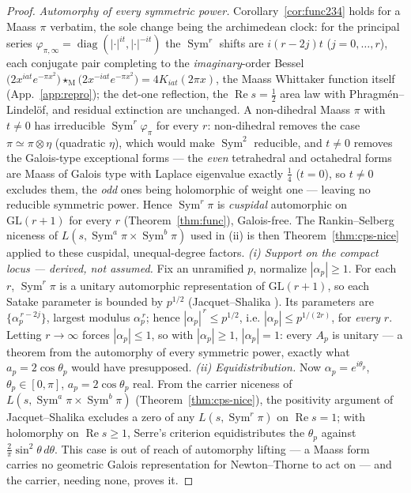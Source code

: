 \documentclass[11pt]{article}
\theoremstyle{definition}
\renewcommand{\Re}{\operatorname{Re}}
\newcommand{\Sym}{\operatorname{Sym}}
\begin{document}
\begin{proof}
\emph{Automorphy of every symmetric power.} Corollary~\ref{cor:func234} holds for a Maass $\pi$ verbatim, the
sole change being the archimedean clock: for the principal series
$\varphi_{\pi,\infty}=\operatorname{diag}(|\cdot|^{it},|\cdot|^{-it})$ the $\Sym^r$ shifts are $i(r-2j)t$
($j=0,\dots,r$), each conjugate pair completing to the \emph{imaginary}-order Bessel
$\big(2x^{iat}e^{-\pi x^2}\big)\star_{\mathrm M}\big(2x^{-iat}e^{-\pi x^2}\big)=4K_{iat}(2\pi x)$, the Maass
Whittaker function itself (App.~\ref{app:repro}); the det-one reflection, the $\Re s=\tfrac12$ area law with
Phragm\'en--Lindel\"of, and residual extinction are unchanged. A non-dihedral Maass $\pi$ with $t\neq0$ has
irreducible $\Sym^r\varphi_\pi$ for every $r$: non-dihedral removes the case $\pi\simeq\pi\otimes\eta$ (quadratic
$\eta$), which would make $\Sym^2$ reducible, and $t\neq0$ removes the Galois-type exceptional forms --- the
\emph{even} tetrahedral and octahedral forms are Maass of Galois type with Laplace eigenvalue exactly $\tfrac14$
($t=0$), so $t\neq0$ excludes them, the \emph{odd} ones being holomorphic of weight one --- leaving no reducible
symmetric power. Hence $\Sym^r\pi$ is \emph{cuspidal} automorphic on $\mathrm{GL}(r+1)$ for
every $r$ (Theorem~\ref{thm:func}), Galois-free. The Rankin--Selberg niceness of $L(s,\Sym^a\pi\times\Sym^b\pi)$
used in (ii) is then Theorem~\ref{thm:cps-nice} applied to these cuspidal, unequal-degree factors.
\emph{(i) Support on the compact locus --- derived, not assumed.} Fix an unramified $p$, normalize
$|\alpha_p|\ge1$. For each $r$, $\Sym^r\pi$ is a unitary automorphic representation of $\mathrm{GL}(r+1)$, so
each Satake parameter is bounded by $p^{1/2}$ (Jacquet--Shalika \cite{JS}). Its parameters are
$\{\alpha_p^{\,r-2j}\}$, largest modulus $\alpha_p^{\,r}$; hence $|\alpha_p|^{\,r}\le p^{1/2}$, i.e.
$|\alpha_p|\le p^{1/(2r)}$, for \emph{every} $r$. Letting $r\to\infty$ forces $|\alpha_p|\le1$, so with
$|\alpha_p|\ge1$, $|\alpha_p|=1$: every $A_p$ is unitary --- a theorem from the automorphy of every symmetric
power, exactly what $a_p=2\cos\theta_p$ would have presupposed.
\emph{(ii) Equidistribution.} Now $\alpha_p=e^{i\theta_p}$, $\theta_p\in[0,\pi]$, $a_p=2\cos\theta_p$ real.
From the carrier niceness of $L(s,\Sym^a\pi\times\Sym^b\pi)$ (Theorem~\ref{thm:cps-nice}), the positivity
argument of Jacquet--Shalika \cite{JS} excludes a zero of any $L(s,\Sym^r\pi)$ on $\Re s=1$; with holomorphy
on $\Re s\ge1$, Serre's criterion \cite{Serre} equidistributes the $\theta_p$ against
$\tfrac2\pi\sin^2\theta\,d\theta$. This case is out of reach of automorphy lifting --- a Maass form carries no
geometric Galois representation for Newton--Thorne \cite{NT} to act on --- and the carrier, needing none,
proves it.
\end{proof}
\end{document}
